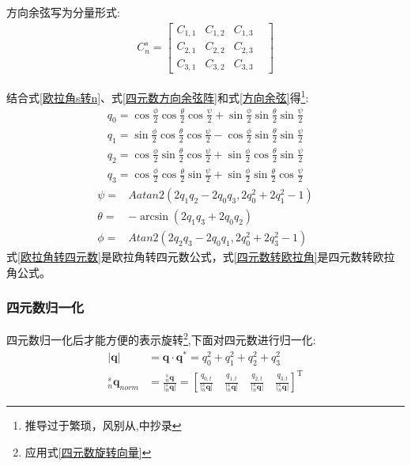\documentclass[12pt,a4paper]{article}
\renewcommand{\citep}[1]{\textsuperscript{\cite{#1}}}
\begin{document}
方向余弦写为分量形式:
\begin{equation}\label{方向余弦}
    \begin{split} 
        C^s_n = \left[\begin{matrix} 
                C_{1,1} & C_{1,2} & C_{1,3} & \\
                C_{2,1} & C_{2,2} & C_{2,3} & \\
                C_{3,1} & C_{3,2} & C_{3,3} &
        \end{matrix}\right]
    \end{split}
\end{equation} 

结合式\ref{欧拉角s转n}、式\ref{四元数方向余弦阵}和式\ref{方向余弦}得\footnote{推导过于繁琐，风别从\citep{捷联惯导航},\citep{9轴融合论文}中抄录}:
\begin{equation}\label{欧拉角转四元数}
    \begin{split} 
        q_0=\cos\frac{\phi}{2}\cos\frac{\theta}{2}\cos\frac{\psi}{2}+\sin\frac{\phi}{2}\sin\frac{\theta}{2}\sin\frac{\psi}{2} \\
        q_1=\sin\frac{\phi}{2}\cos\frac{\theta}{2}\cos\frac{\psi}{2}-\cos\frac{\phi}{2}\sin\frac{\theta}{2}\sin\frac{\psi}{2} \\
        q_2=\cos\frac{\phi}{2}\sin\frac{\theta}{2}\cos\frac{\psi}{2}+\sin\frac{\phi}{2}\cos\frac{\theta}{2}\sin\frac{\psi}{2} \\
        q_3=\cos\frac{\phi}{2}\cos\frac{\theta}{2}\sin\frac{\psi}{2}+\sin\frac{\phi}{2}\sin\frac{\theta}{2}\cos\frac{\psi}{2}
    \end{split}
\end{equation} 
\begin{equation}\label{四元数转欧拉角}
    \begin{split} 
        \psi=&Aatan2(2q_1q_2-2q_0q_3,2q^2_0+2q^2_1-1) \\
        \theta=&-\arcsin(2q_1q_3+2q_0q_2) \\
        \phi=&Atan2(2q_2q_3-2q_0q_1,2q^2_0+2q^2_3-1)
    \end{split}
\end{equation} 
式\ref{欧拉角转四元数}是欧拉角转四元数公式，式\ref{四元数转欧拉角}是四元数转欧拉角公式。

\subsubsection{四元数归一化}
四元数归一化\citep{四元数矢量旋转证明1,四元数矢量旋转证明2}后才能方便的表示旋转\footnote{应用式\ref{四元数旋转向量}},下面对四元数进行归一化:
\begin{equation}\label{四元数归一化}
    \begin{split}
        |\bm{q}|&=\bm{q} \cdot \bm{q}^*={q_0^2+q_1^2+q_2^2+q_3^2}\\ 
        ^s_n\bm{q}_{norm}&=\frac{^s_n\bm{q}}{|^s_n\bm{q}|}
        =\left[\frac{q_{0,t}}{|^s_n\bm{q}|}\quad
            \frac{q_{1,t}}{|^s_n\bm{q}|}\quad
            \frac{q_{2,t}}{|^s_n\bm{q}|}\quad
             \frac{q_{3,t}}{|^s_n\bm{q}|}\right]^\mathrm{T}
    \end{split}
\end{equation} 
\end{document}
